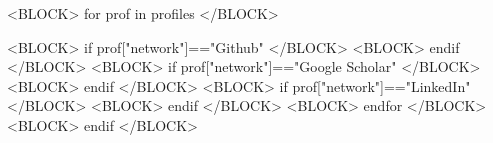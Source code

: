 <BLOCK> for prof in profiles </BLOCK>

  <BLOCK> if prof["network"]=="Github" </BLOCK>
  <BLOCK> endif </BLOCK>
  <BLOCK> if prof["network"]=="Google Scholar" </BLOCK>
  <BLOCK> endif </BLOCK>
  <BLOCK> if prof["network"]=="LinkedIn" </BLOCK>
  <BLOCK> endif </BLOCK>
<BLOCK> endfor </BLOCK>
<BLOCK> endif </BLOCK>


%
%
%
%








